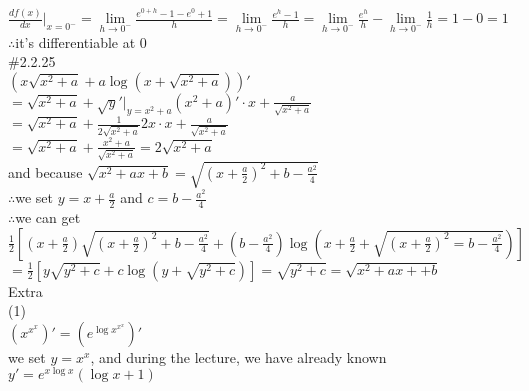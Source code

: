 \documentclass{article}
\begin{document}
$\displaystyle\frac{df(x)}{dx}\bigg|_{x=0^-}=\lim \limits_{h \to 0^-}\frac{e^{0+h}-1-e^0+1}{h}=\lim \limits_{h \to 0^-}\frac{e^h-1}{h}=\lim \limits_{h \to 0^-}\frac{e^h}{h}-\lim \limits_{h \to 0^-}\frac{1}{h}=1-0=1$\\

$\therefore$\qquad it's differentiable at $0$\\

\textcolor[rgb]{0.00,0.00,0.50}{\#2.2.25}\\

$\left(x\sqrt{x^2+a}+a\log(x+\sqrt{x^2+a})\right)'$\\

$=\sqrt{x^2+a}+\sqrt{y}'|_{y=x^2+a}(x^2+a)'\cdot x+\displaystyle\frac{a}{\sqrt{x^2+a}}$\\

$=\sqrt{x^2+a}+\displaystyle\frac{1}{2\sqrt{x^2+a}}2x\cdot x+\frac{a}{\sqrt{x^2+a}}$\\

$=\sqrt{x^2+a}+\displaystyle\frac{x^2+a}{\sqrt{x^2+a}}=2\sqrt{x^2+a}$\\

and because $\sqrt{x^2+ax+b}=\sqrt{\left(x+\displaystyle\frac{a}{2}\right)^2+b-\frac{a^2}{4}}$\\

$\therefore$\qquad we set $y=x+\displaystyle\frac{a}{2}$ and $c=b-\displaystyle\frac{a^2}{4}$\\

$\therefore$\qquad we can get\qquad $\displaystyle\frac{1}{2}\left[\left(x+\frac{a}{2}\right)\sqrt{\left(x+\frac{a}{2}\right)^2+b-\frac{a^2}{4}}+\left(b-\frac{a^2}{4}\right)\log\left(x+\frac{a}{2}+\sqrt{\left(x+\frac{a}{2}\right)^2=b-\frac{a^2}{4}}\right)\right]$\\

$ $\\

\qquad\qquad\qquad\qquad$=\displaystyle\frac{1}{2}\left[y\sqrt{y^2+c}+c\log(y+\sqrt{y^2+c})\right]=\sqrt{y^2+c}=\sqrt{x^2+ax++b}$\\

\textcolor[rgb]{0.00,0.00,0.50}{Extra}\\

(1)\\

$\left(x^{x^x}\right)'=\left(e^{\log x^{x^x}}\right)'$\\

we set $y=x^x$, and during the lecture, we have already known $y'=e^{x\log x}(\log x+1)$\\
\end{document}
